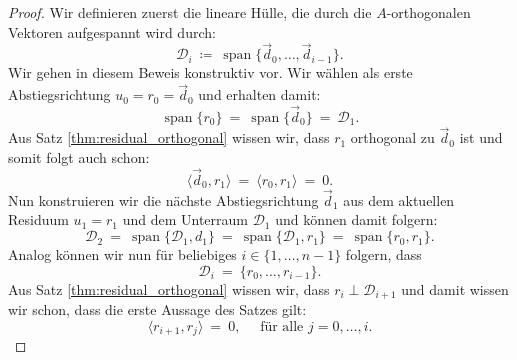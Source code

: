 \begin{proof}
Wir definieren zuerst die lineare Hülle, die durch die $A$-orthogonalen Vektoren aufgespannt wird durch:
\begin{equation*}
\mathcal{D}_i \ \coloneqq \ \operatorname{span}\lbrace \vec{d}_0, \ldots, \vec{d}_{i-1} \rbrace.
\end{equation*}
Wir gehen in diesem Beweis konstruktiv vor.
Wir wählen als erste Abstiegsrichtung $u_0 = r_0 = \vec{d}_0$ und erhalten damit:
\begin{equation*}
\operatorname{span}\lbrace r_0 \rbrace \ = \ \operatorname{span}\lbrace \vec{d}_0 \rbrace \ = \ \mathcal{D}_1.
\end{equation*}
Aus Satz \ref{thm:residual_orthogonal} wissen wir, dass $r_1$ orthogonal zu $\vec{d}_0$ ist und somit folgt auch schon:
\begin{equation*}
\langle \vec{d}_0, r_1 \rangle \ = \ \langle r_0, r_1 \rangle \ = \ 0.
\end{equation*}
Nun konstruieren wir die nächste Abstiegsrichtung $\vec{d}_1$ aus dem aktuellen Residuum $u_1 = r_1$ und dem Unterraum $\mathcal{D}_1$ und können damit folgern:
\begin{equation*}
\mathcal{D}_2 \ = \ \operatorname{span}\lbrace \mathcal{D}_1, d_1 \rbrace \ = \ \operatorname{span}\lbrace \mathcal{D}_1, r_1 \rbrace \ = \ \operatorname{span}\lbrace r_0, r_1 \rbrace.
\end{equation*}
Analog können wir nun für beliebiges $i \in \lbrace 1,\ldots,n-1\rbrace$ folgern, dass
\begin{equation*}
\mathcal{D}_i \ = \ \lbrace r_0,\ldots, r_{i-1} \rbrace.
\end{equation*}
Aus Satz \ref{thm:residual_orthogonal} wissen wir, dass $r_i \perp \mathcal{D}_{i+1}$ und damit wissen wir schon, dass die erste Aussage des Satzes gilt:
\begin{equation*}
\langle r_{i+1}, r_j \rangle \ = \ 0, \quad \text{ für alle } j=0,\ldots,i.
\end{equation*}


\end{proof}
